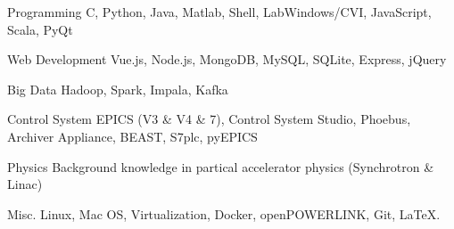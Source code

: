 

\begin{cvskills}

  \cvskill
    {Programming} %
    {C, Python, Java, Matlab, Shell, LabWindows/CVI, JavaScript, Scala, PyQt} %

  \cvskill
    {Web Development} %
    {Vue.js, Node.js, MongoDB, MySQL, SQLite, Express, jQuery} %

  \cvskill
	{Big Data} %
    {Hadoop, Spark, Impala, Kafka} %

  \cvskill
   {Control System} %
   {EPICS (V3 \& V4 \& 7), Control System Studio, Phoebus, Archiver Appliance, BEAST, S7plc, pyEPICS} %

  \cvskill
    {Physics} %
    {Background knowledge in partical accelerator physics (Synchrotron \& Linac)} %

  \cvskill
    {Misc.} %
    {Linux, Mac OS, Virtualization, Docker, openPOWERLINK, Git, \LaTeX.} %
  
\end{cvskills}
